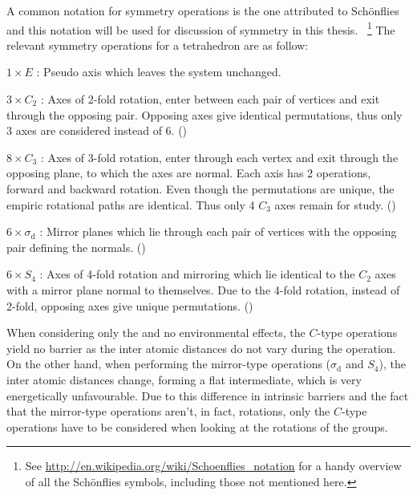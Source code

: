 A common notation for symmetry operations is the one attributed to Sch\"onflies~\cite{schonflies-notation-1889} and this notation will be used for discussion of symmetry in this thesis.
~\footnote{See \url{http://en.wikipedia.org/wiki/Schoenflies_notation} for a handy overview of all the Sch\"onflies symbols, including those not mentioned here.}
The relevant symmetry operations for a tetrahedron are as follow:
\bit
\item $1 \times E$ : Pseudo axis which leaves the system unchanged.
\item $3 \times C_2$ : Axes of 2-fold rotation, enter between each pair of vertices and exit through the opposing pair.
Opposing axes give identical permutations, thus only 3 axes are considered instead of 6.
()
\item $8 \times C_3$ : Axes of 3-fold rotation, enter through each vertex and exit through the opposing plane, to which the axes are normal. Each axis has 2 operations, forward and backward rotation.
Even though the permutations are unique, the empiric rotational paths are identical.
Thus only 4 $C_3$ axes remain for study.
()
\item $6 \times \sigma_\text{d}$ : Mirror planes which lie through each pair of vertices with the opposing pair defining the normals.
()
\item $6 \times S_4$ : Axes of 4-fold rotation and mirroring which lie identical to the $C_2$ axes with a mirror plane normal to themselves. Due to the 4-fold rotation, instead of 2-fold, opposing axes give unique permutations.
()
\eit

When considering only the  and no environmental effects, the $C$-type operations yield no barrier as the inter atomic distances do not vary during the operation.
On the other hand, when performing the mirror-type operations ($\sigma_\text{d}$ and $S_4$), the inter atomic distances change, forming a flat  intermediate, which is very energetically unfavourable.
Due to this difference in intrinsic barriers and the fact that the mirror-type operations aren't, in fact, rotations, only the $C$-type operations have to be considered when looking at the rotations of the  groups.


